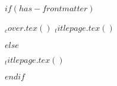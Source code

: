 $if(has-frontmatter)$
  \begin{frontmatter}
    \begin{titlepage}
      $_cover.tex()$%
      $_titlepage.tex()$
    \end{titlepage}
    \setcounter{page}{1}
  \end{frontmatter}
$else$
  \begin{titlepage}
    $_titlepage.tex()$
  \end{titlepage}
$endif$
